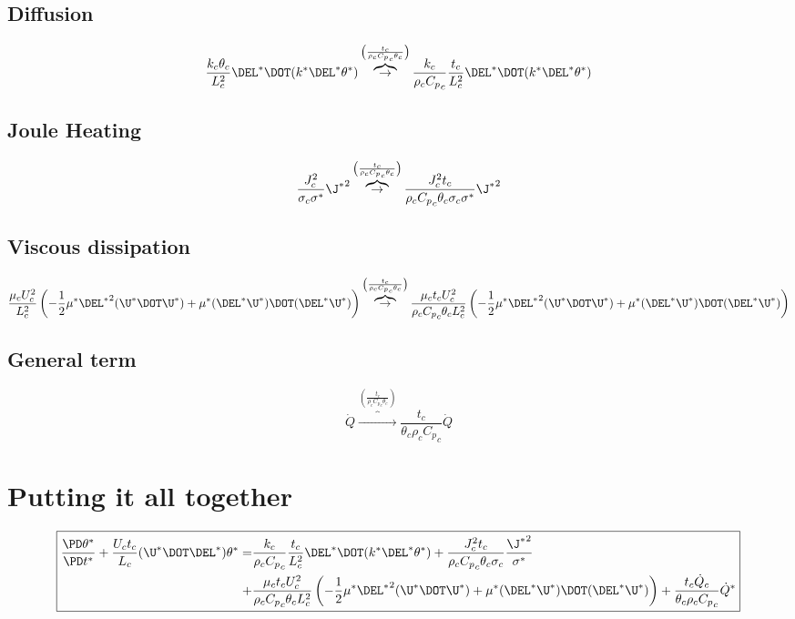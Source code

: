 \documentclass[11pt]{article}
\newcommand{\OB}{\overbrace{\rightarrow}^{\left(\frac{t_c}{\rho_c {C_p}_c \theta_c}\right)}}
\newcommand{\Cp}{{C_p}_c}
\begin{document}
\subsection{Diffusion}
\begin{equation}
	\frac{k_c \theta_c}{L_c^2} \DEL^* \DOT (k^* \DEL^* \theta^*)
	\OB
	\frac{k_c}{\rho_c \Cp} \frac{t_c}{L_c^2} \DEL^* \DOT (k^* \DEL^* \theta^*)
\end{equation}
\subsection{Joule Heating}
\begin{equation}
	\frac{J_c^2}{\sigma_c \sigma^*} {\J^*}^2
	\OB
	\frac{J_c^2 t_c}{\rho_c \Cp \theta_c \sigma_c \sigma^*} {\J^*}^2
\end{equation}
\subsection{Viscous dissipation}
\begin{equation}
	\frac{\mu_c U_c^2}{L_c^2} \left( - \frac{1}{2} \mu^* {\DEL^*}^2 (\U^* \DOT \U^*) + \mu^* (\DEL^* \U^*) \DOT (\DEL^* \U^*) \right)
	\OB
	\frac{\mu_c t_c U_c^2}{\rho_c \Cp \theta_c L_c^2} \left( - \frac{1}{2} \mu^* {\DEL^*}^2 (\U^* \DOT \U^*) + \mu^* (\DEL^* \U^*) \DOT (\DEL^* \U^*) \right)
\end{equation}
\subsection{General term}
\begin{equation}
	\dot{Q}
	\OB
	\frac{t_c}{\theta_c \rho_c \Cp}\dot{Q}
\end{equation}
\section{Putting it all together}
\begin{equation}\boxed{\begin{aligned}
	\frac{\PD \theta^*}{\PD t^*}
	+ \frac{U_c t_c}{L_c} (\U^* \DOT \DEL^*) \theta^*
	=& \frac{k_c}{\rho_c \Cp} \frac{t_c}{L_c^2} \DEL^* \DOT (k^* \DEL^* \theta^*)
	+ \frac{J_c^2 t_c}{\rho_c \Cp \theta_c \sigma_c} \frac{{\J^*}^2}{\sigma^*} \\
	+& \frac{\mu_c t_c U_c^2}{\rho_c \Cp \theta_c L_c^2} \left( - \frac{1}{2} \mu^* {\DEL^*}^2 (\U^* \DOT \U^*) + \mu^* (\DEL^* \U^*) \DOT (\DEL^* \U^*) \right)
	+ \frac{t_c \dot{Q}_c}{\theta_c \rho_c \Cp} \dot{Q}^*
\end{aligned}}\end{equation}
\end{document}
